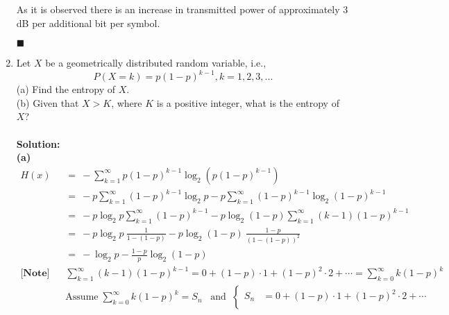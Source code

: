 \documentclass[a4paper,12pt]{article}
\begin{document}
\begin{enumerate}
\begin{center}
\begin{tabular}{ | c || c | c | c |}
                 \hline
                \end{tabular}
            \end{center}
            As it is observed there is an increase in transmitted power of approximately 3 dB per additional bit per symbol.
            \begin{flushright}
                $\blacksquare$
            \end{flushright}
        \item
            Let $X$ be a geometrically distributed random variable, i.e., $$P(X = k) = p(1-p)^{k - 1}, k = 1, 2, 3, ...$$
            (a) Find the entropy of $X$. \\ 
            (b) Given that $X > K$, where $K$ is a positive integer, what is the entropy of $X$? \\ \\ 
            \textbf{Solution:} \\
            \textbf{(a)} 
            \begin{align*}
                H(x) &= \ - \sum_{k = 1}^{\infty} p \left(1 - p\right)^{k - 1} \log_2 \left(p\left(1 - p\right)^{k - 1}\right) \\
                     &= \ -p \sum_{k = 1}^{\infty} \left(1 - p\right)^{k - 1} \log_2 p - p \sum_{k = 1}^{\infty} \left(1 - p\right)^{k - 1} \log_2 \left(1 - p\right)^{k - 1} \\ 
                     &= \ -p \log_2 p \sum_{k = 1}^{\infty} \left(1 - p\right)^{k - 1} - p \log_2 (1 - p) \sum_{k = 1}^{\infty} (k - 1)\left(1 - p\right)^{k - 1} \\
                     &= \ -p \log_2 p \ \frac{1}{1 - \left(1 - p\right)} - p \log_2 (1 - p) \ \frac{1 - p}{\left( 1 - \left(1 - p\right) \right)^2} \\ 
                     &= \ - \log_2 p - \frac{1 - p}{p} \log_2 (1 - p) \\ 
                \textbf{[Note]} \;\;\; & \sum_{k = 1}^{\infty} (k - 1)\left(1 - p\right)^{k - 1} = 0 + (1 - p) \cdot 1 + (1 - p)^2 \cdot 2 + \cdots = \sum_{k = 0}^{\infty} k \left(1 - p\right)^{k} \\ 
                                 & \text{Assume} \; \sum_{k = 0}^{\infty} k \left(1 - p\right)^{k} = S_n \;\;\; \text{and} \;\;
                                 \left\{ 
                                \begin{aligned}
                                    S_n &= 0 + (1 - p) \cdot 1 + (1 - p)^2 \cdot 2 + \cdots \\

\end{aligned}
\end{align*}
\end{enumerate}
\end{document}
